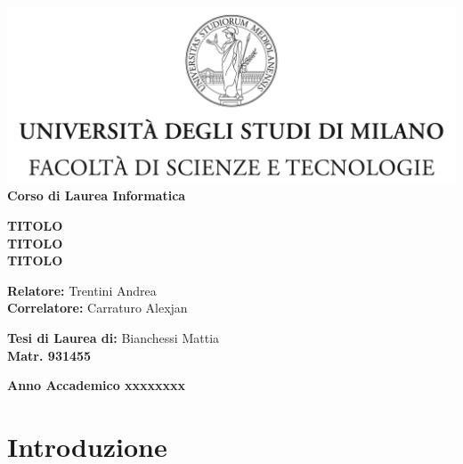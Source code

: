 \documentclass[12pt,a4paper]{report}
\begin{document}
\begin{titlepage}
\begin{center}
\includegraphics[width=\textwidth]{Img/Logo.jpg}\\
{\large{\bf Corso di Laurea Informatica}}
\end{center}
\vspace{12mm}
\begin{center}
{\huge{\bf TITOLO}}\\
\vspace{4mm}
{\huge{\bf TITOLO}}\\
\vspace{4mm}
{\huge{\bf TITOLO}}\\
\end{center}
\vspace{12mm}
\begin{flushleft}
{\large{\bf Relatore:}}
{\large{Trentini Andrea}}\\
\vspace{4mm}
{\large{\bf Correlatore:}}
{\large{Carraturo Alexjan}}\\
\end{flushleft}
\vspace{12mm}
\begin{flushright}
{\large{\bf Tesi di Laurea di:}}
{\large{Bianchessi Mattia}}\\
{\large{\bf Matr. 931455}}\\
\end{flushright}
\vspace{4mm}
\begin{center}
{\large{\bf Anno Accademico xxxxxxxx}}
\end{center}
\end{titlepage}

\listoftodos

\chapter*{Introduzione}
\end{document}
